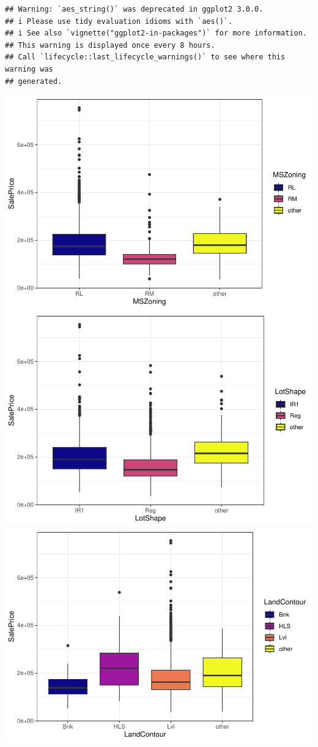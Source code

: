 \documentclass[
]{article}
\begin{document}
\begin{verbatim}
## Warning: `aes_string()` was deprecated in ggplot2 3.0.0.
## i Please use tidy evaluation idioms with `aes()`.
## i See also `vignette("ggplot2-in-packages")` for more information.
## This warning is displayed once every 8 hours.
## Call `lifecycle::last_lifecycle_warnings()` to see where this warning was
## generated.
\end{verbatim}

\includegraphics{report_files/figure-latex/categorical variables-1.pdf}
\includegraphics{report_files/figure-latex/categorical variables-2.pdf}
\includegraphics{report_files/figure-latex/categorical variables-3.pdf}
\end{document}
